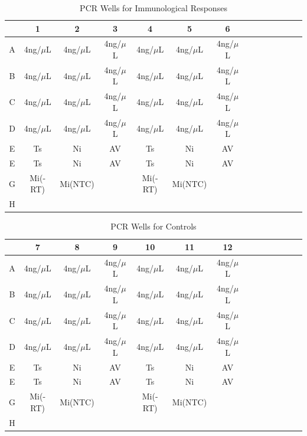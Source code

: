 \documentclass[journal, a4paper]{IEEEtran}
\begin{document}
  \begin{table}[!hbt]
    \begin{center}
    \caption{PCR Wells for Immunological Responses}
    \label{tab:simParameters}
    \begin{tabular}{|c|c|c|c|c|c|c|c|c|c|c|c|c|c|}
      \hline
      & 1 & 2 & 3 & 4 & 5 & 6\\
      \hline
      A & 4ng/$\mu$L & 4ng/$\mu$L & 4ng/$\mu$L & 4ng/$\mu$L & 4ng/$\mu$L & 4ng/$\mu$L\\
      \hline
      B & 4ng/$\mu$L & 4ng/$\mu$L & 4ng/$\mu$L & 4ng/$\mu$L & 4ng/$\mu$L & 4ng/$\mu$L\\
      \hline
      C & 4ng/$\mu$L & 4ng/$\mu$L & 4ng/$\mu$L & 4ng/$\mu$L & 4ng/$\mu$L & 4ng/$\mu$L\\
      \hline
      D & 4ng/$\mu$L & 4ng/$\mu$L & 4ng/$\mu$L & 4ng/$\mu$L & 4ng/$\mu$L & 4ng/$\mu$L\\
      \hline
      E & Ts & Ni & AV & Ts & Ni & AV\\
      \hline
      E & Ts & Ni & AV & Ts & Ni & AV\\
      \hline
      G & Mi(-RT) & Mi(NTC) & & Mi(-RT) & Mi(NTC) & \\
      \hline
      H & & & & & &\\
      \hline
    \end{tabular}
    \end{center}
  \end{table}

  \begin{table}[!hbt]
    \begin{center}
    \caption{PCR Wells for Controls}
    \label{tab:simParameters}
    \begin{tabular}{|c|c|c|c|c|c|c|c|c|c|c|c|c|c|}
      \hline
      & 7 & 8 & 9 & 10 & 11 & 12 \\
      \hline
      A & 4ng/$\mu$L & 4ng/$\mu$L & 4ng/$\mu$L & 4ng/$\mu$L & 4ng/$\mu$L & 4ng/$\mu$L\\
      \hline
      B & 4ng/$\mu$L & 4ng/$\mu$L & 4ng/$\mu$L & 4ng/$\mu$L & 4ng/$\mu$L & 4ng/$\mu$L\\
      \hline
      C & 4ng/$\mu$L & 4ng/$\mu$L & 4ng/$\mu$L & 4ng/$\mu$L & 4ng/$\mu$L & 4ng/$\mu$L\\
      \hline
      D & 4ng/$\mu$L & 4ng/$\mu$L & 4ng/$\mu$L & 4ng/$\mu$L & 4ng/$\mu$L & 4ng/$\mu$L\\
      \hline
      E & Ts & Ni & AV & Ts & Ni & AV\\
      \hline
      E & Ts & Ni & AV & Ts & Ni & AV\\
      \hline
      G & Mi(-RT) & Mi(NTC) & & Mi(-RT) & Mi(NTC) & \\
      \hline
      H & & & & & &\\
      \hline
    \end{tabular}
    \end{center}
  \end{table}
\end{document}
